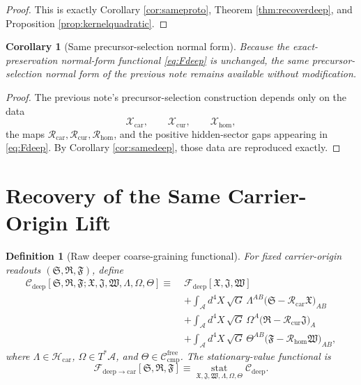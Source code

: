 \documentclass[11pt]{article}
\newcommand{\Sub}{\mathcal A}
\newcommand{\CompFree}{\mathscr C_{\mathrm{cmp}}^{\mathrm{free}}}
\newcommand{\DeepFunctional}{\mathscr F_{\mathrm{deep}}}
\newcommand{\DeepToCar}{\mathscr F_{\mathrm{deep}\to\mathrm{car}}}
\newcommand{\CarrierClass}{\mathscr H_{\mathrm{car}}}
\newcommand{\CarrierSeed}{\mathfrak S}
\newcommand{\RelabelSeed}{\mathfrak R}
\newcommand{\FreeSeed}{\mathfrak F}
\newcommand{\StrainMult}{\Lambda}
\newcommand{\NeutralMult}{\Omega}
\newcommand{\FreeMult}{\Theta}
\newcommand{\DeepTensorClass}{\mathscr X_{\mathrm{car}}}
\newcommand{\DeepRelabelClass}{\mathscr X_{\mathrm{cur}}}
\newcommand{\DeepFreeClass}{\mathscr X_{\mathrm{hom}}}
\newcommand{\DeepTensor}{\mathfrak X}
\newcommand{\DeepRelabel}{\mathfrak J}
\newcommand{\DeepFree}{\mathfrak W}
\newcommand{\CarRead}{\mathcal R_{\mathrm{car}}}
\newcommand{\CurRead}{\mathcal R_{\mathrm{cur}}}
\newcommand{\HomRead}{\mathcal R_{\mathrm{hom}}}
\newtheorem{definition}{Definition}
\newtheorem{corollary}{Corollary}
\begin{document}
\begin{proof}
This is exactly Corollary \ref{cor:sameproto}, Theorem \ref{thm:recoverdeep}, and Proposition \ref{prop:kernelquadratic}.
\end{proof}

\begin{corollary}[Same precursor-selection normal form]
\label{cor:precursoravailable}
Because the exact-preservation normal-form functional \eqref{eq:Fdeep} is unchanged, the same precursor-selection normal form of the previous note remains available without modification.
\end{corollary}

\begin{proof}
The previous note's precursor-selection construction depends only on the data
\[
\DeepTensorClass,\qquad
\DeepRelabelClass,\qquad
\DeepFreeClass,
\]
the maps \(\CarRead,\CurRead,\HomRead\), and the positive hidden-sector gaps appearing in \eqref{eq:Fdeep}. By Corollary \ref{cor:samedeep}, those data are reproduced exactly.
\end{proof}

\section{Recovery of the Same Carrier-Origin Lift}

\begin{definition}[Raw deeper coarse-graining functional]
\label{def:deep_cg}
For fixed carrier-origin readouts \((\CarrierSeed,\RelabelSeed,\FreeSeed)\), define
\begin{equation}
\begin{aligned}
\mathscr C_{\mathrm{deep}}
[\CarrierSeed,\RelabelSeed,\FreeSeed;
\DeepTensor,\DeepRelabel,\DeepFree,
\StrainMult,\NeutralMult,\FreeMult]
\equiv\;
&\DeepFunctional[\DeepTensor,\DeepRelabel,\DeepFree]
\\
&+\int_{\Sub} d^4X\,\sqrt{G}\,
\StrainMult^{AB}\bigl(\CarrierSeed-\CarRead\DeepTensor\bigr)_{AB}
\\
&+\int_{\Sub} d^4X\,\sqrt{G}\,
\NeutralMult^A\bigl(\RelabelSeed-\CurRead\DeepRelabel\bigr)_A
\\
&+\int_{\Sub} d^4X\,\sqrt{G}\,
\FreeMult^{AB}\bigl(\FreeSeed-\HomRead\DeepFree\bigr)_{AB},
\end{aligned}
\label{eq:Cdeep}
\end{equation}
where \(\StrainMult\in\CarrierClass\), \(\NeutralMult\in T^*\Sub\), and \(\FreeMult\in\CompFree\). The stationary-value functional is
\begin{equation}
\DeepToCar[\CarrierSeed,\RelabelSeed,\FreeSeed]
\equiv
\operatorname*{stat}_{\DeepTensor,\DeepRelabel,\DeepFree,\StrainMult,\NeutralMult,\FreeMult}
\mathscr C_{\mathrm{deep}}.
\label{eq:Fdeepstat}
\end{equation}
\end{definition}
\end{document}
